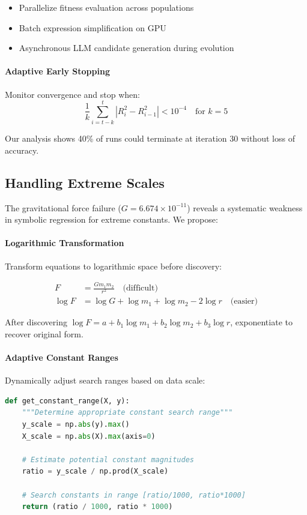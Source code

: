 \begin{itemize}
    \item Parallelize fitness evaluation across populations
    \item Batch expression simplification on GPU
    \item Asynchronous LLM candidate generation during evolution
\end{itemize}

\paragraph{Adaptive Early Stopping}
Monitor convergence and stop when:
\begin{equation}
\frac{1}{k}\sum_{i=t-k}^{t} |R^2_i - R^2_{i-1}| < 10^{-4} \quad \text{for } k = 5
\end{equation}

Our analysis shows 40\% of runs could terminate at iteration 30 without loss of accuracy.

\subsection{Handling Extreme Scales}

The gravitational force failure ($G = 6.674 \times 10^{-11}$) reveals a systematic weakness in symbolic regression for extreme constants. We propose:

\paragraph{Logarithmic Transformation}
Transform equations to logarithmic space before discovery:

\begin{align}
F &= \frac{Gm_1m_2}{r^2} \quad \text{(difficult)} \\
\log F &= \log G + \log m_1 + \log m_2 - 2\log r \quad \text{(easier)}
\end{align}

After discovering $\log F = a + b_1 \log m_1 + b_2 \log m_2 + b_3 \log r$, exponentiate to recover original form.

\paragraph{Adaptive Constant Ranges}
Dynamically adjust search ranges based on data scale:

\begin{lstlisting}[language=Python, caption=Adaptive Constant Search]
def get_constant_range(X, y):
    """Determine appropriate constant search range"""
    y_scale = np.abs(y).max()
    X_scale = np.abs(X).max(axis=0)

    # Estimate potential constant magnitudes
    ratio = y_scale / np.prod(X_scale)

    # Search constants in range [ratio/1000, ratio*1000]
    return (ratio / 1000, ratio * 1000)
\end{lstlisting}

